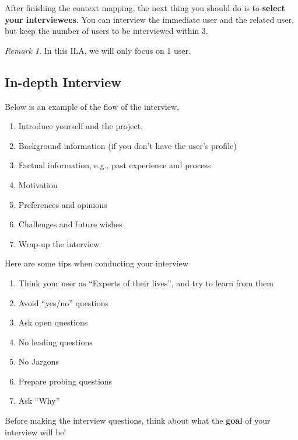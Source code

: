 \documentclass[math,code]{amznotes}
\theoremstyle{remark}
\newtheorem*{remark}{Remark}
\begin{document}
After finishing the context mapping, the next thing you should do is to \textbf{select your interviewees}. You can interview the immediate user and the related user, but keep the number of users to be interviewed within 3.
\begin{notebox}
    \begin{remark}
        In this ILA, we will only focus on 1 user.
    \end{remark}
\end{notebox}

\subsection{In-depth Interview}
Below is an example of the flow of the interview,
\begin{enumerate}
    \item Introduce yourself and the project.
    \item Background information (if you don't have the user's profile)
    \item Factual information, e.g., past experience and process
    \item Motivation
    \item Preferences and opinions
    \item Challenges and future wishes
    \item Wrap-up the interview
\end{enumerate}
Here are some tips when conducting your interview
\begin{enumerate}
    \item Think your user as ``Experts of their lives'', and try to learn from them
    \item Avoid ``yes/no'' questions
    \item Ask open questions
    \item No leading questions
    \item No Jargons
    \item Prepare probing questions
    \item Ask ``Why''
\end{enumerate}

Before making the interview questions, think about what the \textbf{goal} of your interview will be!
\end{document}
